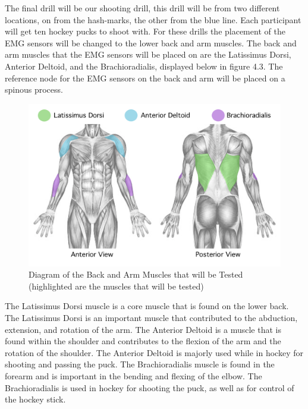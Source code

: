 The final drill will be our shooting drill, this drill will be from two different locations, on from the hash-marks, the other from the blue line. Each participant will get ten hockey pucks to shoot with. For these drills the placement of the EMG sensors will be changed to the lower back and arm muscles. The back and arm muscles that the EMG sensors will be placed on are the Latissimus Dorsi, Anterior Deltoid, and the Brachioradialis, displayed below in figure 4.3\cite{5}. The reference node for the EMG sensors on the back and arm will be placed on a spinous process.  
\par
\begin{figure}[htb]
\centering
\includegraphics[scale=0.5]{Progress_Report/figs/shootingmuscles.png}
\caption{Diagram of the Back and Arm Muscles that will be Tested (highlighted are the muscles that will be tested)\cite{6}}
\label{fig:ShootingMuscles}
\end{figure}
\par
The Latissimus Dorsi muscle is a core muscle that is found on the lower back. The Latissimus Dorsi is an important muscle that contributed to the abduction, extension, and rotation of the arm\cite{5}. The Anterior Deltoid is a muscle that is found within the shoulder and contributes to the flexion of the arm and the rotation of the shoulder\cite{5}. The Anterior Deltoid is majorly used while in hockey for shooting and passing the puck\cite{7}. The Brachioradialis muscle is found in the forearm and is important in the bending and flexing of the elbow\cite{5}. The Brachioradialis is used in hockey for shooting the puck, as well as for control of the hockey stick\cite{7}.

